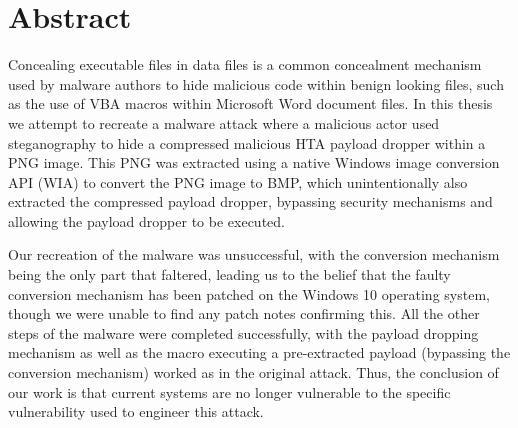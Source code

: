 \chapter{Abstract}
Concealing executable files in data files is a common concealment mechanism used by malware authors to hide malicious
code within benign looking files, such as the use of \acrshort{VBA} macros within Microsoft Word document files.
In this thesis we attempt to recreate a malware attack where a malicious actor used steganography to hide a compressed 
malicious \acrshort{HTA} payload dropper within a \acrshort{PNG} image. This \acrshort{PNG} was extracted using a native 
Windows image conversion \acrshort{API} (\acrshort{WIA}) to convert the \acrshort{PNG} image to \acrshort{BMP}, which
unintentionally also extracted the compressed payload dropper, bypassing security mechanisms and allowing the payload
dropper to be executed. 

Our recreation of the malware was unsuccessful, with the conversion mechanism being the only part that faltered, leading
us to the belief that the faulty conversion mechanism has been patched on the Windows 10 operating system, though we 
were unable to find any patch notes confirming this. 
All the other steps of the malware were completed successfully, with the payload dropping mechanism as 
well as the macro executing a pre-extracted payload (bypassing the conversion mechanism) worked as in the original
attack. Thus, the conclusion of our work is that current systems are no longer vulnerable to the specific vulnerability
used to engineer this attack.

